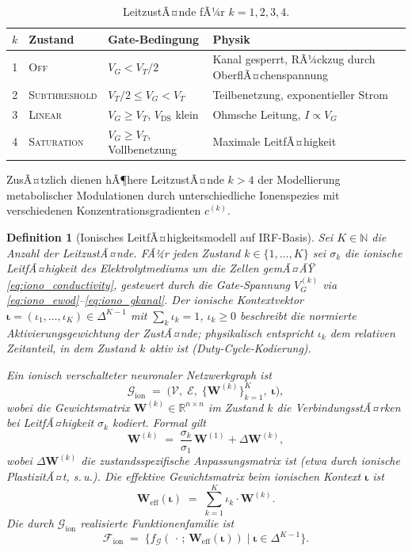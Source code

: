 ﻿\documentclass[12pt, a4paper, openany]{report}
\newtheorem{definition}[theorem]{Definition}
\newcommand{\R}{\mathbb{R}}
\newcommand{\N}{\mathbb{N}}
\newcommand{\calG}{\mathcal{G}}
\newcommand{\calV}{\mathcal{V}}
\newcommand{\calE}{\mathcal{E}}
\newcommand{\calF}{\mathcal{F}}
\begin{document}
\begin{table}
	\centering
	\begin{tabular}{clll}
		\toprule
		$k$ & Zustand & Gate-Bedingung & Physik \\
		\midrule
		1 & \textsc{Off} & $V_G < V_T/2$ & Kanal gesperrt, RÃ¼ckzug durch OberflÃ¤chenspannung \\
		2 & \textsc{Subthreshold} & $V_T/2 \leq V_G < V_T$ & Teilbenetzung, exponentieller Strom \\
		3 & \textsc{Linear} & $V_G \geq V_T$, $V_\mathrm{DS}$ klein & Ohmsche Leitung, $I \propto V_G$ \\
		4 & \textsc{Saturation} & $V_G \geq V_T$, Vollbenetzung & Maximale LeitfÃ¤higkeit \\
		\bottomrule
	\end{tabular}
	\label{tab:Leitzustaende}
	\caption{LeitzustÃ¤nde fÃ¼r $k = 1, 2, 3, 4$.}
\end{table}

\noindent ZusÃ¤tzlich dienen hÃ¶here LeitzustÃ¤nde $k > 4$ der Modellierung
metabolischer Modulationen durch unterschiedliche Ionenspezies mit
versch\-iedenen Konzentrationsgradienten $c^{(k)}$.

\begin{definition}[Ionisches LeitfÃ¤higkeitsmodell auf IRF-Basis]
\label{def:ionic_conductance}
Sei $K \in \N$ die Anzahl der LeitzustÃ¤nde.  FÃ¼r jeden Zustand $k \in
\{1,\ldots,K\}$ sei $\sigma_k$ die ionische LeitfÃ¤higkeit des
Elektrolytmediums um die Zellen gemÃ¤ÃŸ \eqref{eq:iono_conductivity},
gesteuert durch die Gate-Span\-nung $V_G^{(k)}$ via
\eqref{eq:iono_ewod}--\eqref{eq:iono_gkanal}.  Der
\emph{ionische Kontextvektor}
$\bm{\iota} = (\iota_1, \ldots, \iota_K) \in \Delta^{K-1}$
mit $\sum_k \iota_k = 1$, $\iota_k \geq 0$
beschreibt die normierte Aktivierungsgewichtung der ZustÃ¤nde; physikalisch
entspricht $\iota_k$ dem relativen Zeitanteil, in dem Zustand $k$ aktiv ist
(Duty-Cycle-Kodierung).

Ein \emph{ionisch verschalteter neuronaler Netzwerkgraph} ist
\[
  \calG_{\mathrm{ion}}
  \;=\;
  \bigl(\calV,\; \calE,\; \{\bm{W}^{(k)}\}_{k=1}^K,\; \bm{\iota}\bigr),
\]
wobei die Gewichtsmatrix $\bm{W}^{(k)} \in \R^{n \times n}$ im Zustand $k$
die VerbindungsstÃ¤rken bei LeitfÃ¤higkeit $\sigma_k$ kodiert.
Formal gilt
\begin{equation}
  \label{eq:ionic_weight_scaling}
  \bm{W}^{(k)} \;=\; \frac{\sigma_k}{\sigma_1}\,\bm{W}^{(1)} +\Delta\bm{W}^{(k)},
\end{equation}
wobei $\Delta\bm{W}^{(k)}$ die zustandsspezifische Anpassungsmatrix ist
(etwa durch ionische PlastizitÃ¤t, s.\,u.).  Die \emph{effektive Gewichtsmatrix}
beim ionischen Kontext $\bm{\iota}$ ist
\begin{equation}
  \label{eq:ionic_weight}
  \bm{W}_{\mathrm{eff}}(\bm{\iota})
  \;=\;
  \sum_{k=1}^{K} \iota_k \cdot \bm{W}^{(k)}.
\end{equation}
Die durch $\calG_{\mathrm{ion}}$ realisierte Funktionenfamilie ist
\[
  \calF_{\mathrm{ion}}
  \;=\;
  \bigl\{f_{\calG}(\,\cdot\,;\, \bm{W}_{\mathrm{eff}}(\bm{\iota})) \;\big|\;
         \bm{\iota} \in \Delta^{K-1}\bigr\}.
\]
\end{definition}
\end{document}
